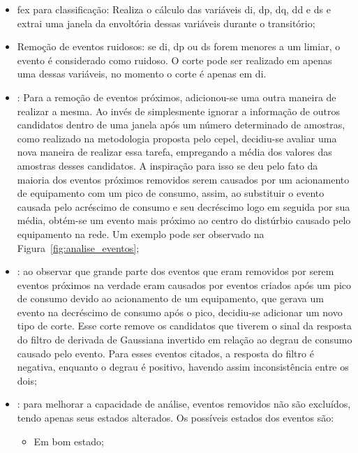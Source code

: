 \begin{itemize}
\item \acs{fex} para classificação: Realiza o cálculo das variáveis
\acs{di}, \acs{dp}, \acs{dq}, \acs{dd} e \acs{ds} e extrai uma janela
da envoltória dessas variáveis durante o transitório;
\item Remoção de eventos ruidosos: se \acs{di}, \acs{dp} ou \acs{ds}
forem menores a um limiar, o evento é considerado como ruidoso. O
corte pode ser realizado em apenas uma dessas variáveis, no momento o
corte é apenas em \acs{di}.
\item {}: Para a
remoção de eventos próximos, adicionou-se uma outra maneira de realizar
a mesma. Ao invés de simplesmente ignorar a informação de outros
candidatos dentro de uma janela após um número determinado de
amostras, como realizado na metodologia proposta pelo \acs{cepel},
decidiu-se avaliar uma nova maneira de realizar essa tarefa,
empregando a média dos valores das amostras desses
candidatos. A inspiração para isso se deu pelo fato da maioria dos
eventos próximos removidos serem causados por um acionamento de
equipamento com um pico de consumo, assim, ao substituir o evento
causada pelo acréscimo de consumo e seu decréscimo logo em seguida por
sua média, obtém-se um evento mais próximo ao centro do distúrbio
causado pelo equipamento na rede. Um exemplo pode ser observado na
Figura~\ref{fig:analise_eventos}; 
\item {}: ao observar que grande parte dos
eventos que eram removidos por serem eventos próximos na verdade eram
causados por eventos criados após um pico de consumo devido ao
acionamento de um equipamento, que gerava um evento na decréscimo de
consumo após o pico, decidiu-se adicionar um novo tipo de corte. Esse
corte remove os candidatos que tiverem o sinal da resposta do filtro
de derivada de Gaussiana invertido em relação ao degrau de consumo
causado pelo evento. Para esses eventos citados, a resposta do filtro
é negativa, enquanto o degrau é positivo, havendo assim inconsistência
entre os dois;
\item {}: para
melhorar a capacidade de análise, eventos removidos não são excluídos,
tendo apenas seus estados alterados. Os possíveis estados dos eventos
são:
\begin{itemize}
\item Em bom estado;

\end{itemize}
\end{itemize}
